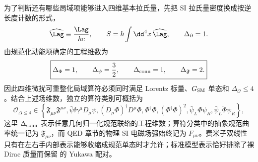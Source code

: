 为了判断还有哪些局域项能够进入四维基本拉氏量，先把 SI 拉氏量密度换成按逆长度计数的形式，
\begin{equation}
 \widehat{\Lag}\equiv\frac{\Lag}{\hbar c},
 \qquad
 S=\hbar\int\dd^4 x\,\widehat{\Lag},
 \qquad \Delta_\partial=1.
 \label{eq:sm-geometric-lagrangian-dp68}
\end{equation}
由规范化动能项确定的工程维数为
\begin{equation}
 \boxed{
 \Delta_\Phi=1,\qquad
 \Delta_\psi=\frac32,\qquad
 \Delta_{\rm conn}=1,\qquad
 \Delta_{\mathfrak F}=2.}
 \label{eq:sm-field-engineering-dimensions-dp68}
\end{equation}
因此四维微扰可重整化局域算符必须同时满足 Lorentz 标量、$G_{\rm SM}$ 单态和 $\Delta_{\mathcal O}\le4$。结合上述场维数，独立的算符类别可概括为
\begin{equation}
 \boxed{
 \mathcal O_{\Delta\le4}\in
 \left\{
 \mathfrak F_{\mu\nu}\mathfrak F^{\mu\nu},
 \bar\psi\ii\gamma^\mu D_\mu\psi,
 (D_\mu\Phi)^\dagger D^\mu\Phi,
 \Phi^\dagger\Phi,
 (\Phi^\dagger\Phi)^2,
 \bar\psi_L\Phi\psi_R,
 \bar\psi_L\widetilde\Phi\psi_R
 \right\},}
 \label{eq:sm-renormalizable-operator-classes-dp68}
\end{equation}
这里 $\Delta_{\rm conn}$ 表示任意几何归一化规范联络的工程维数；算符分类中的抽象规范曲率统一记为 $\mathfrak F_{\mu\nu}$，而 QED 章节的物理 SI 电磁场强始终记为 $F_{\mu\nu}$。费米子双线性只有在左右手内部表示能够收缩成规范单态时才允许；标准模型表示恰好排除了裸 Dirac 质量而保留 的 Yukawa 配对。


